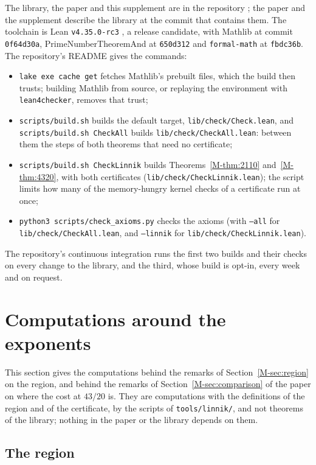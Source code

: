 \documentclass[11pt]{article}
\newcommand{\file}[1]{\nolinkurl{#1}}
\numberwithin{equation}{section}
\begin{document}
The library, the paper and this supplement are in the repository \cite{repo}; the paper and the supplement describe
the library at the commit that contains them. The toolchain is Lean \texttt{v4.35.0-rc3}
\cite{lean4}, a release candidate, with Mathlib \cite{mathlib} at commit \texttt{0f64d30a},
PrimeNumberTheoremAnd at \texttt{650d312} and \texttt{formal-math} at \texttt{fbdc36b}. The repository's README gives
the commands:
\begin{itemize}
\item \texttt{lake exe cache get} fetches Mathlib's prebuilt files, which the build then trusts; building Mathlib from
  source, or replaying the environment with \texttt{lean4checker}, removes that trust;
\item \texttt{scripts/build.sh} builds the default target, \file{lib/check/Check.lean}, and \texttt{scripts/build.sh
  CheckAll} builds \file{lib/check/CheckAll.lean}: between them the steps of both theorems that need no certificate;
\item \texttt{scripts/build.sh CheckLinnik} builds Theorems~\ref{M-thm:2110} and~\ref{M-thm:4320}, with both
  certificates (\file{lib/check/CheckLinnik.lean}); the script limits how many of the memory-hungry kernel checks of a
  certificate run at once;
\item \texttt{python3 scripts/check\_axioms.py} checks the axioms (with \texttt{--all} for
  \file{lib/check/CheckAll.lean}, and \texttt{--linnik} for \file{lib/check/CheckLinnik.lean}).
\end{itemize}
The repository's continuous integration runs the first two builds and their checks on every change to the library,
and the third, whose build is opt-in, every week and on request.

\section{Computations around the exponents}\label{sup:computations}

This section gives the computations behind the remarks of Section~\ref{M-sec:region} on the region, and behind the
remarks of Section~\ref{M-sec:comparison} of the paper on where the cost at $43/20$ is. They are computations with the
definitions of the region and
of the certificate, by the scripts of \file{tools/linnik/}, and not theorems of the library; nothing in the paper or the
library depends on them.

\subsection*{The region}
\end{document}
